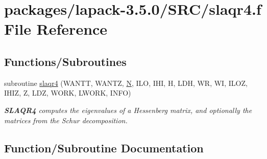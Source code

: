 \hypertarget{slaqr4_8f}{}\section{packages/lapack-\/3.5.0/\+S\+R\+C/slaqr4.f File Reference}
\label{slaqr4_8f}
\subsection*{Functions/\+Subroutines}
\begin{DoxyCompactItemize}
\item 
subroutine \hyperlink{slaqr4_8f_a6373540d7de0dbdea9c85b78913c178c}{slaqr4} (W\+A\+N\+T\+T, W\+A\+N\+T\+Z, \hyperlink{polmisc_8c_a0240ac851181b84ac374872dc5434ee4}{N}, I\+L\+O, I\+H\+I, H, L\+D\+H, W\+R, W\+I, I\+L\+O\+Z, I\+H\+I\+Z, Z, L\+D\+Z, W\+O\+R\+K, L\+W\+O\+R\+K, I\+N\+F\+O)
\begin{DoxyCompactList}\small\item\em {\bfseries S\+L\+A\+Q\+R4} computes the eigenvalues of a Hessenberg matrix, and optionally the matrices from the Schur decomposition. \end{DoxyCompactList}\end{DoxyCompactItemize}


\subsection{Function/\+Subroutine Documentation}
\hypertarget{slaqr4_8f_a6373540d7de0dbdea9c85b78913c178c}{}
